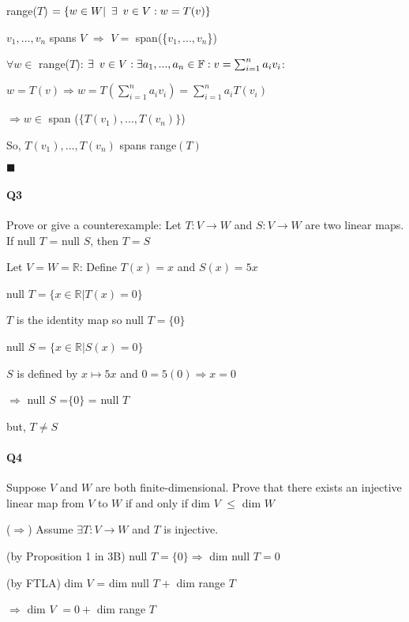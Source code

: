 \documentclass{article}
\begin{document}
range($T$) $= \{w \in W |\enskip \exists\enskip v \in V: w = T(v)\}$

$v_1, ... ,v_n$ spans $V$ $\Rightarrow$ $V =$ span(\{$v_1, ... ,v_n$\})



$\forall w \in$ range($T$): $\exists\enskip v \in V: \exists a_1, ... ,a_n \in \mathbb{F}: v = \sum_{i=1}^n a_iv_i$:

$w = T(v) \Rightarrow w = T(\sum_{i=1}^n a_iv_i) =
\sum_{i=1}^na_iT(v_i)$

$\Rightarrow w \in$ span ($\{T(v_1), ... ,T(v_n)\}$)

So, $T(v_1), ... ,T(v_n)$ spans range$(T)$
\vspace{0.618 em}

$\blacksquare$


\paragraph{Q3} Prove or give a counterexample: Let $T: V \rightarrow
W$ and $S: V \rightarrow W$ are two linear maps. If null $T$ = null
$S$, then $T = S$

Let $V=W=\mathbb{R}$: Define $T(x)=x$ and $S(x)=5x$

null $T = \{x\in\mathbb{R}| T(x) = 0\} $

$T$ is the identity map so null $T = \{0\}$

null $S = \{x\in\mathbb{R}| S(x) = 0\}$

$S$ is defined by $x \mapsto 5x$ and $0=5(0) \Rightarrow x = 0$

$\Rightarrow$ null $S$ =$\{0\}$ = null $T$

but, $T \neq S$

\newpage
\paragraph{Q4} Suppose $V$ and $W$ are both finite-dimensional. Prove
that there exists an injective linear map from $V$ to $W$ if and only
if dim $V$ $\leq$ dim $W$

\vspace{0.618 em}

($\Rightarrow$) Assume $\exists T: V \rightarrow W$ and $T$ is
injective.

(by Proposition 1 in 3B) null $T = \{0\} \Rightarrow$ dim null $T = 0$

(by FTLA) dim $V$ = dim null $T +$  dim range $T$

$\Rightarrow$ dim $V$
$= 0 + $ dim range $T$
\end{document}
